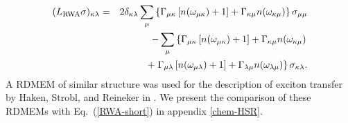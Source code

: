 \documentclass[12pt,twoside,a4paper]{report}
\begin{document}
\begin{eqnarray}
  (L_{\rm RWA}\sigma)
    _{\kappa \lambda } =
                         &&   2\delta_{\kappa \lambda }
                              \sum\limits_\mu
                              \left\{
                                  \Gamma_{\mu \kappa}
                                  \left[
                                      n(\omega_{\mu \kappa })+1
                                  \right]
                               +  \Gamma_{\kappa \mu}
                                  n(\omega_{\kappa \mu  })
                              \right\}
                              \sigma_{\mu\mu}                       \nonumber \\ 
                         && - \sum\limits_\mu
                              \left\{
                                  \Gamma_{\mu \kappa}
                                  \left[
                                      n(\omega_{\mu \kappa })+1
                                  \right]
                               +  \Gamma_{\kappa \mu}
                                  n(\omega_{ \kappa \mu })
                              \right.                                \nonumber\\
                         && + \left.
                                  \Gamma_{\mu  \lambda }
                                  \left[
                                      n(\omega_{\mu  \lambda  })+1
                                  \right]
                               +  \Gamma_{ \lambda  \mu}
                                  n(\omega_{  \lambda  \mu })
                              \right\} 
                              \sigma_{\kappa \lambda }.
\label{RWA-short}
\end{eqnarray}
A RDMEM of similar structure was used for the description of exciton transfer
by Haken, Strobl, and Reineker
in \cite{rein82,hake72,hake73,rein79,herm93}. 
We present the comparison of these RDMEMs with Eq.~(\ref{RWA-short})
in appendix \ref{chem-HSR}.
\end{document}
